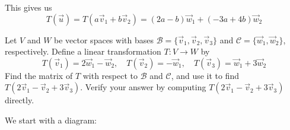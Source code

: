 \documentclass{ximera}
\begin{document}
\begin{exploration}
This gives us
$$T(\vec{u})=T(a\vec{v}_1+b\vec{v}_2)=(2a-b)\vec{w}_1+(-3a+4b)\vec{w}_2$$

\end{exploration}


\begin{example}\label{ex:transmatrix1}
Let $V$ and $W$ be vector spaces with bases $\mathcal{B}=\{\vec{v}_1, \vec{v}_2, \vec{v}_3\}$ and $\mathcal{C}=\{\vec{w}_1, \vec{w}_2\}$, respectively.  Define a linear transformation $T:V\rightarrow W$ by $$T(\vec{v}_1)=2\vec{w}_1-\vec{w}_2,\quad T(\vec{v}_2)=-\vec{w}_1,\quad T(\vec{v}_3)=\vec{w}_1+3\vec{w}_2$$
Find the matrix of $T$ with respect to $\mathcal{B}$ and $\mathcal{C}$, and use it to find $T(2\vec{v}_1-\vec{v}_2+3\vec{v}_3)$.  Verify your answer by computing $T(2\vec{v}_1-\vec{v}_2+3\vec{v}_3)$ directly.

\begin{explanation}
We start with a diagram:
\begin{center}
\end{center}
\end{explanation}
\end{example}
\end{document}
